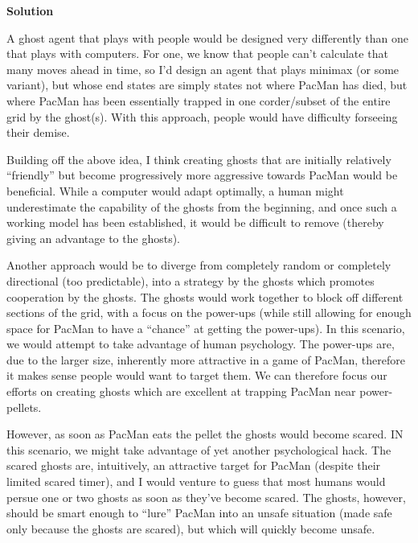 \documentclass[11pt]{article}
\newcounter{AnswerCounter}
\newcounter{SubAnswerCounter}
\newenvironment{answer}[0]{
  \setcounter{SubAnswerCounter}{1}
  \bigskip
  \textbf{Solution \arabic{AnswerCounter}}
  \\
  \begin{small}
}{
  \end{small}
  \stepcounter{AnswerCounter}
}
\begin{document}
\begin{answer}
A ghost agent that plays with people would be designed very differently than one that plays with computers. For one, we know that people can't calculate that many moves ahead in time, so I'd design an agent that plays minimax (or some variant), but whose end states are simply states not where PacMan has died, but where PacMan has been essentially trapped in one corder/subset of the entire grid by the ghost(s). With this approach, people would have difficulty forseeing their demise.

Building off the above idea, I think creating ghosts that are initially relatively ``friendly'' but become progressively more aggressive towards PacMan would be beneficial. While a computer would adapt optimally, a human might underestimate the capability of the ghosts from the beginning, and once such a working model has been established, it would be difficult to remove (thereby giving an advantage to the ghosts).

Another approach would be to diverge from completely random or completely directional (too predictable), into a strategy by the ghosts which promotes cooperation by the ghosts. The ghosts would work together to block off different sections of the grid, with a focus on the power-ups (while still allowing for enough space for PacMan to have a ``chance'' at getting the power-ups). In this scenario, we would attempt to take advantage of human psychology. The power-ups are, due to the larger size, inherently more attractive in a game of PacMan, therefore it makes sense people would want to target them. We can therefore focus our efforts on creating ghosts which are excellent at trapping PacMan near power-pellets.

However, as soon as PacMan eats the pellet the ghosts would become scared. IN this scenario, we might take advantage of yet another psychological hack. The scared ghosts are, intuitively, an attractive target for PacMan (despite their limited scared timer), and I would venture to guess that most humans would persue one or two ghosts as soon as they've become scared. The ghosts, however, should be smart enough to ``lure'' PacMan into an unsafe situation (made safe only because the ghosts are scared), but which will quickly become unsafe.
\end{answer}
\end{document}

